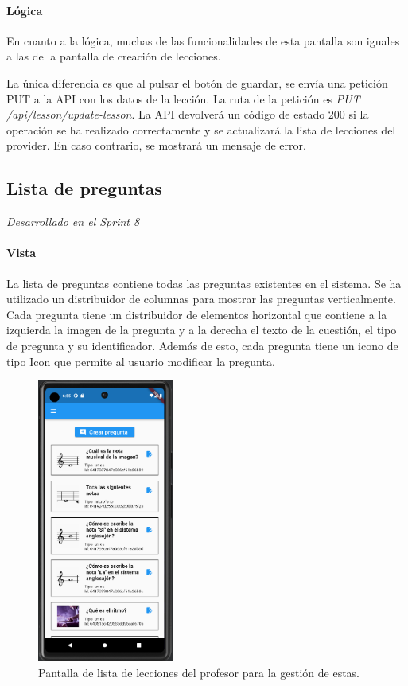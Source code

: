 \paragraph*{Lógica}
En cuanto a la lógica, muchas de las funcionalidades de esta pantalla son iguales a las de la pantalla de creación de lecciones.

La única diferencia es que al pulsar el botón de guardar, se envía una petición PUT a la API con los datos de la lección. La ruta de la petición es \textit{PUT /api/lesson/update-lesson}. La API devolverá un código de estado 200 si la operación se ha realizado correctamente y se actualizará la lista de lecciones del provider. En caso contrario, se mostrará un mensaje de error.

\subsection{Lista de preguntas} 
\textit{Desarrollado en el Sprint 8}

\paragraph*{Vista}
La lista de preguntas contiene todas las preguntas existentes en el sistema. Se ha utilizado un distribuidor de columnas para mostrar las preguntas verticalmente. 
Cada pregunta tiene un distribuidor de elementos horizontal que contiene a la izquierda la imagen de la pregunta y a la derecha el texto de la cuestión, el tipo de pregunta y su identificador. 
Además de esto, cada pregunta tiene un icono de tipo Icon que permite al usuario modificar la pregunta.
\begin{figure}[H]
  \centering
  \includegraphics[width=0.4\textwidth]{imagenes/c7/listapreguntas.png}
  \caption{Pantalla de lista de lecciones del profesor para la gestión de estas.} 
  \label{fig:login}
\end{figure}

